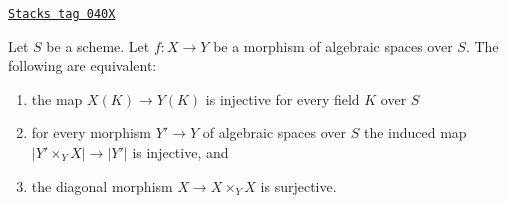 \begin{lemma}
\label{spaces-morphisms-lemma-universally-injective}
\href{https://stacks.math.columbia.edu/tag/040X}{\texttt{Stacks tag 040X}}

Let $S$ be a scheme.
Let $f : X \to Y$ be a morphism of algebraic spaces over $S$.
The following are equivalent:
\begin{enumerate}
\item the map $X(K) \to Y(K)$ is injective for every field $K$ over $S$
\item for every morphism $Y' \to Y$ of algebraic spaces over $S$
the induced map $|Y' \times_Y X| \to |Y'|$ is injective, and
\item the diagonal morphism $X \to X \times_Y X$ is surjective.
\end{enumerate}
\end{lemma}

